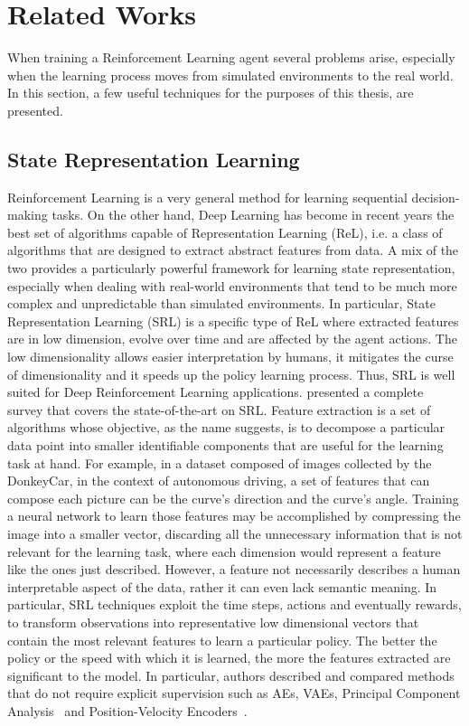 \chapter{Related Works}

When training a Reinforcement Learning agent several problems arise, especially when the learning process moves from simulated environments to the real world. In this section, a few useful techniques for the purposes of this thesis, are presented.

\section{State Representation Learning} \label{sec:srl}
Reinforcement Learning is a very general method for learning sequential decision-making tasks. On the other hand, Deep Learning has become in recent years the best set of algorithms capable of Representation Learning (ReL), i.e. a class of algorithms that are designed to extract abstract features from data. A mix of the two provides a particularly powerful framework for learning state representation, especially when dealing with real-world environments that tend to be much more complex and unpredictable than simulated environments. In particular, State Representation Learning (SRL) is a specific type of ReL where extracted features are in low dimension, evolve over time and are affected by the agent actions. The low dimensionality allows easier interpretation by humans, it mitigates the curse of dimensionality and it speeds up the policy learning process. Thus, SRL is well suited for Deep Reinforcement Learning applications. \citet{DBLP:journals/corr/abs-1802-04181} presented a complete survey that covers the state-of-the-art on SRL. Feature extraction is a set of algorithms whose objective, as the name suggests, is to decompose a particular data point into smaller identifiable components that are useful for the learning task at hand. For example, in a dataset composed of images collected by the DonkeyCar, in the context of autonomous driving, a set of features that can compose each picture can be the curve's direction and the curve's angle. Training a neural network to learn those features may be accomplished by compressing the image into a smaller vector, discarding all the unnecessary information that is not relevant for the learning task, where each dimension would represent a feature like the ones just described. However, a feature not necessarily describes a human interpretable aspect of the data, rather it can even lack semantic meaning. In particular, SRL techniques exploit the time steps, actions and eventually rewards, to transform observations into representative low dimensional vectors that contain the most relevant features to learn a particular policy. The better the policy or the speed with which it is learned, the more the features extracted are significant to the model. In particular, authors described and compared methods that do not require explicit supervision such as AEs, VAEs, Principal Component Analysis~\citep{https://doi.org/10.48550/arxiv.1505.00322} and Position-Velocity Encoders~\citep{DBLP:journals/corr/JonschkowskiHSR17}.

